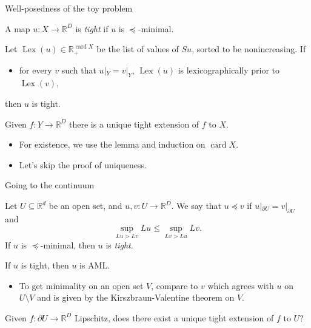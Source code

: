 \documentclass[10pt]{beamer}
\newcommand{\RR}{\mathbb{R}}
\DeclareMathOperator{\card}{card}
\DeclareMathOperator{\Lex}{Lex}
\begin{document}
\begin{frame}{Well-posedness of the toy problem}
\begin{definition}
A map $u: X \to \RR^D$ is \emph{tight} if $u$ is $\preceq$-minimal.
\end{definition}

\begin{lemma}
Let $\Lex(u) \in \RR^{\card X}_+$ be the list of values of $Su$, sorted to be nonincreasing.
If
\begin{itemize}
\item for every $v$ such that $u|_Y = v|_Y$, $\Lex(u)$ is lexicographically prior to $\Lex(v)$,
\end{itemize}
then $u$ is tight.
\end{lemma}

\begin{theorem}
Given $f: Y \to \RR^D$ there is a unique tight extension of $f$ to $X$.
\end{theorem}

\begin{itemize}
    \item For existence, we use the lemma and induction on $\card X$.
    \item Let's skip the proof of uniqueness.
\end{itemize}
\end{frame}

\begin{frame}{Going to the continuum}
\begin{definition}
Let $U \subseteq \RR^d$ be an open set, and $u, v: U \to \RR^D$.
We say that $u \preceq v$ if $u|_{\partial U} = v|_{\partial U}$ and
$$\sup_{Lu > Lv} Lu \leq \sup_{Lv > Lu} Lv.$$
If $u$ is $\preceq$-minimal, then $u$ is \emph{tight}.
\end{definition}

\begin{lemma}
If $u$ is tight, then $u$ is AML.
\end{lemma}

\begin{itemize}
\item To get minimality on an open set $V$, compare to $v$ which agrees with $u$ on $U \setminus V$ and is given by the Kirszbraun-Valentine theorem on $V$.
\end{itemize}

\begin{problem}
Given $f: \partial U \to \RR^D$ Lipschitz, does there exist a unique tight extension of $f$ to $U$?
\end{problem}
\end{frame}
\end{document}
